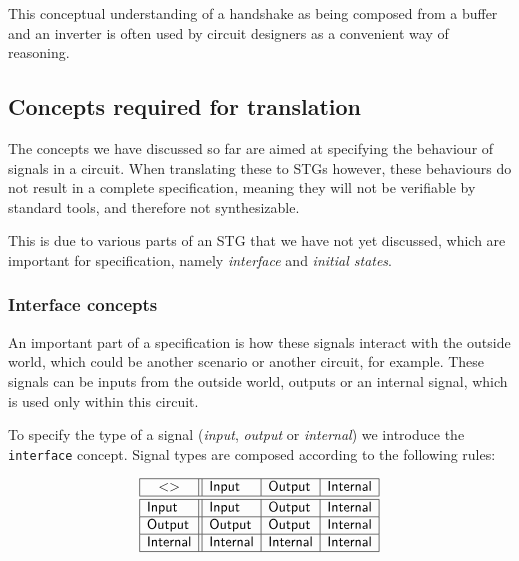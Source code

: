\documentclass[british,conference,compsoc]{IEEEtran}
\begin{document}
This conceptual understanding of a handshake as being composed
from a buffer and an inverter is often used by circuit designers as
a convenient way of reasoning.

\vspace{-3.5mm}

\subsection{Concepts required for translation\label{sub:trans-concepts}}

\vspace{-3.5mm}

The concepts we have discussed so far are aimed at specifying the behaviour of 
signals in a circuit. When translating these to STGs however, these behaviours 
do not result in a complete specification, meaning they will not be 
verifiable by standard tools, and therefore not synthesizable.

This is due to various parts of an STG that we have not yet discussed, which 
are important for specification, namely \emph{interface} and 
\emph{initial states}.

\vspace{-3mm}

\subsubsection{Interface concepts\label{sub:interface}} 

An important part of a specification is how these signals interact with the 
outside world, which could be another scenario or another circuit, for example.
These signals can be inputs from the outside world, outputs or an internal 
signal, which is used only within this circuit. 

To specify the type of a signal (\emph{input},
\emph{output} or \emph{internal}) we introduce the \texttt{interface} concept.
Signal types are composed according to the following rules:

\vspace{-2mm}

\[
\begin{array}{|l||l|l|l|}
\hline
\multicolumn{1}{|c||}{<>} & \mathsf{Input} & \mathsf{Output} &
\mathsf{Internal} \\ \hline \hline
\mathsf{Input} & \mathsf{Input} & \mathsf{Output} & \mathsf{Internal} \\ \hline
\mathsf{Output} & \mathsf{Output} & \mathsf{Output} & \mathsf{Internal} \\
\hline
\mathsf{Internal}& \mathsf{Internal} & \mathsf{Internal} & \mathsf{Internal} \\
\hline
\end{array}
\]
\end{document}
